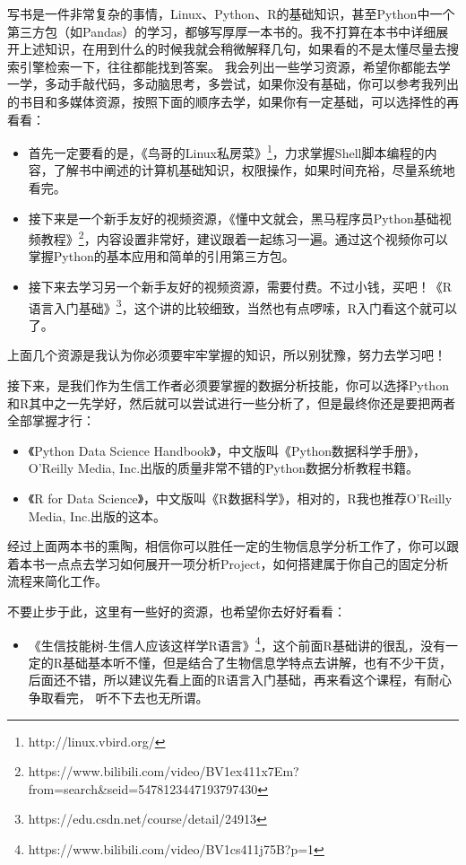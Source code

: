 写书是一件非常复杂的事情，Linux、Python、R的基础知识，甚至Python中一个第三方包（如Pandas）的学习，都够写厚厚一本书的。我不打算在本书中详细展开上述知识，在用到什么的时候我就会稍微解释几句，如果看的不是太懂尽量去搜索引擎检索一下，往往都能找到答案。
我会列出一些学习资源，希望你都能去学一学，多动手敲代码，多动脑思考，多尝试，如果你没有基础，你可以参考我列出的书目和多媒体资源，按照下面的顺序去学，如果你有一定基础，可以选择性的再看看：

\begin{itemize}
	\item
	首先一定要看的是，《鸟哥的Linux私房菜》\footnote{http://linux.vbird.org/}，力求掌握Shell脚本编程的内容，了解书中阐述的计算机基础知识，权限操作，如果时间充裕，尽量系统地看完。
	\item
	接下来是一个新手友好的视频资源，《懂中文就会，黑马程序员Python基础视频教程》\footnote{https://www.bilibili.com/video/BV1ex411x7Em?from=search\&seid=5478123447193797430}，内容设置非常好，建议跟着一起练习一遍。通过这个视频你可以掌握Python的基本应用和简单的引用第三方包。
	\item
	接下来去学习另一个新手友好的视频资源，需要付费。不过小钱，买吧！《R语言入门基础》\footnote{https://edu.csdn.net/course/detail/24913}，这个讲的比较细致，当然也有点啰嗦，R入门看这个就可以了。
\end{itemize}

上面几个资源是我认为你必须要牢牢掌握的知识，所以别犹豫，努力去学习吧！

接下来，是我们作为生信工作者必须要掌握的数据分析技能，你可以选择Python和R其中之一先学好，然后就可以尝试进行一些分析了，但是最终你还是要把两者全部掌握才行：

\begin{itemize}
	\item 
	《Python Data Science Handbook》，中文版叫《Python数据科学手册》，O'Reilly Media, Inc.出版的质量非常不错的Python数据分析教程书籍。
	\item
	《R for Data Science》，中文版叫《R数据科学》，相对的，R我也推荐O'Reilly Media, Inc.出版的这本。
\end{itemize}

经过上面两本书的熏陶，相信你可以胜任一定的生物信息学分析工作了，你可以跟着本书一点点去学习如何展开一项分析Project，如何搭建属于你自己的固定分析流程来简化工作。

不要止步于此，这里有一些好的资源，也希望你去好好看看：

\begin{itemize}
	\item 
《生信技能树-生信人应该这样学R语言》\footnote{https://www.bilibili.com/video/BV1cs411j75B?p=1}，这个前面R基础讲的很乱，没有一定的R基础基本听不懂，但是结合了生物信息学特点去讲解，也有不少干货，后面还不错，所以建议先看上面的R语言入门基础，再来看这个课程，有耐心争取看完， 听不下去也无所谓。
\end{itemize}


